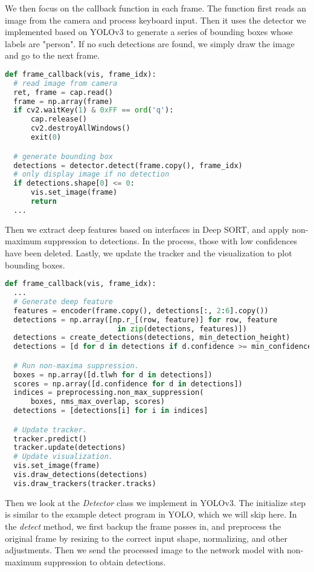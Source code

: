 \documentclass{article}
\numberwithin{algorithm}{section}
\begin{document}
We then focus on the callback function in each frame.
The function first reads an image from the camera and process keyboard input.
Then it uses the detector we implemented based on YOLOv3 to generate a series of bounding boxes whose labels are "person".
If no such detections are found, we simply draw the image and go to the next frame.

\begin{lstlisting}[language=Python]
def frame_callback(vis, frame_idx):
  # read image from camera
  ret, frame = cap.read()
  frame = np.array(frame)
  if cv2.waitKey(1) & 0xFF == ord('q'):
      cap.release()
      cv2.destroyAllWindows()
      exit(0)

  # generate bounding box
  detections = detector.detect(frame.copy(), frame_idx)
  # only display image if no detection
  if detections.shape[0] <= 0:
      vis.set_image(frame)
      return
  ...
\end{lstlisting}

Then we extract deep features based on interfaces in Deep SORT, and apply non-maximum suppression to detections.
In the process, those with low confidences have been deleted.
Lastly, we update the tracker and the visualization to plot bounding boxes.

\begin{lstlisting}[language=Python]
def frame_callback(vis, frame_idx):
  ...
  # Generate deep feature
  features = encoder(frame.copy(), detections[:, 2:6].copy())
  detections = np.array([np.r_[(row, feature)] for row, feature
                          in zip(detections, features)])
  detections = create_detections(detections, min_detection_height)
  detections = [d for d in detections if d.confidence >= min_confidence]

  # Run non-maxima suppression.
  boxes = np.array([d.tlwh for d in detections])
  scores = np.array([d.confidence for d in detections])
  indices = preprocessing.non_max_suppression(
      boxes, nms_max_overlap, scores)
  detections = [detections[i] for i in indices]

  # Update tracker.
  tracker.predict()
  tracker.update(detections)
  # Update visualization.
  vis.set_image(frame)
  vis.draw_detections(detections)
  vis.draw_trackers(tracker.tracks)
\end{lstlisting}

Then we look at the \textsl{Detector} class we implement in YOLOv3.
The initialize step is similar to the example detect program in YOLO, which we will skip here.
In the \textsl{detect} method, we first backup the frame passes in, and preprocess the original frame by resizing to the correct input shape, normalizing, and other adjustments.
Then we send the processed image to the network model with non-maximum suppression to obtain detections.
\end{document}
